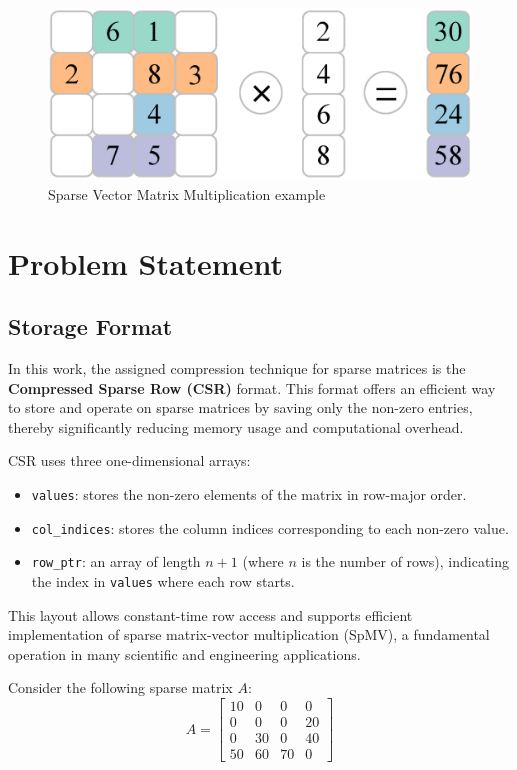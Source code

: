 \documentclass[conference]{IEEEtran}
\begin{document}
\begin{figure}[ht]
    \centering
    \includegraphics[width=0.95\linewidth]{SmVM.png}
    \caption{Sparse Vector Matrix Multiplication example}
    \label{fig:spvmexample}
\end{figure}

\section{Problem Statement}
\subsection{Storage Format}

In this work, the assigned compression technique for sparse matrices is the \textbf{Compressed Sparse Row (CSR)} format. This format offers an efficient way to store and operate on sparse matrices by saving only the non-zero entries, thereby significantly reducing memory usage and computational overhead. 

CSR uses three one-dimensional arrays:
\begin{itemize}
    \item \texttt{values}: stores the non-zero elements of the matrix in row-major order.
    \item \texttt{col\_indices}: stores the column indices corresponding to each non-zero value.
    \item \texttt{row\_ptr}: an array of length $n+1$ (where $n$ is the number of rows), indicating the index in \texttt{values} where each row starts.
\end{itemize}

This layout allows constant-time row access and supports efficient implementation of sparse matrix-vector multiplication (SpMV), a fundamental operation in many scientific and engineering applications.

Consider the following sparse matrix $A$:
\[
A = \begin{bmatrix}
    10 & 0  & 0  & 0  \\ 
    0  & 0  & 0  & 20 \\
    0  & 30 & 0  & 40 \\
    50 & 60 & 70 & 0
\end{bmatrix}
\]
\end{document}
